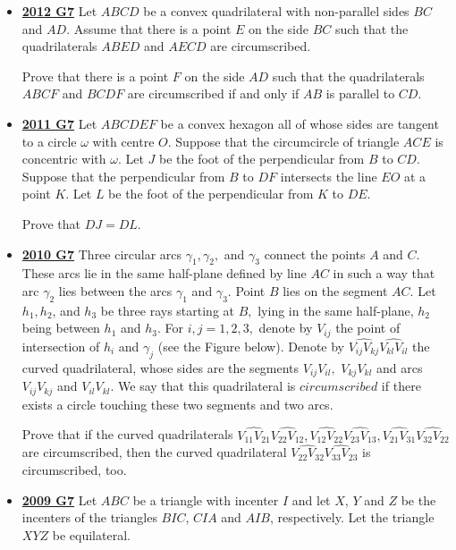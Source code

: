 \documentclass[11pt]{scrartcl}
\begin{document}
\begin{itemize}[leftmargin=*]
Prove that if the points $I, X,$ and $Y$ are collinear, then the points $I, W ,$ and $Z$ are also collinear.
\item \href{https://artofproblemsolving.com/community/c6h546183p3160591}{\textbf{2012 G7}} Let $ABCD$ be a convex quadrilateral with non-parallel sides $BC$ and $AD$. Assume that there is a point $E$ on the side $BC$ such that the quadrilaterals $ABED$ and $AECD$ are circumscribed. 

Prove that there is a point $F$ on the side $AD$ such that the quadrilaterals $ABCF$ and $BCDF$ are circumscribed if and only if $AB$ is parallel to $CD$.
\item \href{https://artofproblemsolving.com/community/c6h488832p2739339}{\textbf{2011 G7}} Let $ABCDEF$ be a convex hexagon all of whose sides are tangent to a circle $\omega$ with centre $O$. Suppose that the circumcircle of triangle $ACE$ is concentric with $\omega$. Let $J$ be the foot of the perpendicular from $B$ to $CD$. Suppose that the perpendicular from $B$ to $DF$ intersects the line $EO$ at a point $K$. Let $L$ be the foot of the perpendicular from $K$ to $DE$. 

Prove that $DJ=DL$.
\newpage

\item \href{https://artofproblemsolving.com/community/c6h418638p2361996}{\textbf{2010 G7}} Three circular arcs $\gamma_1, \gamma_2,$ and $\gamma_3$ connect the points $A$ and $C.$ These arcs lie in the same half-plane defined by line $AC$ in such a way that arc $\gamma_2$ lies between the arcs $\gamma_1$ and $\gamma_3.$ Point $B$ lies on the segment $AC.$ Let $h_1, h_2$, and $h_3$ be three rays starting at $B,$ lying in the same half-plane, $h_2$ being between $h_1$ and $h_3.$ For $i, j = 1, 2, 3,$ denote by $V_{ij}$ the point of intersection of $h_i$ and $\gamma_j$ (see the Figure below). Denote by $\widehat{V_{ij}V_{kj}}\widehat{V_{kl}V_{il}}$ the curved quadrilateral, whose sides are the segments $V_{ij}V_{il},$ $V_{kj}V_{kl}$ and arcs $V_{ij}V_{kj}$ and $V_{il}V_{kl}.$ We say that this quadrilateral is $circumscribed$ if there exists a circle touching these two segments and two arcs. 

Prove that if the curved quadrilaterals $\widehat{V_{11}V_{21}}\widehat{V_{22}V_{12}}, \widehat{V_{12}V_{22}}\widehat{V_{23}V_{13}},\widehat{V_{21}V_{31}}\widehat{V_{32}V_{22}}$ are circumscribed, then the curved quadrilateral $\widehat{V_{22}V_{32}}\widehat{V_{33}V_{23}}$ is circumscribed, too.

\item \href{https://artofproblemsolving.com/community/c6h355794p1932939}{\textbf{2009 G7}} Let $ABC$ be a triangle with incenter $I$ and let $X$, $Y$ and $Z$ be the incenters of the triangles $BIC$, $CIA$ and $AIB$, respectively. Let the triangle $XYZ$ be equilateral. 


\end{itemize}
\end{document}
